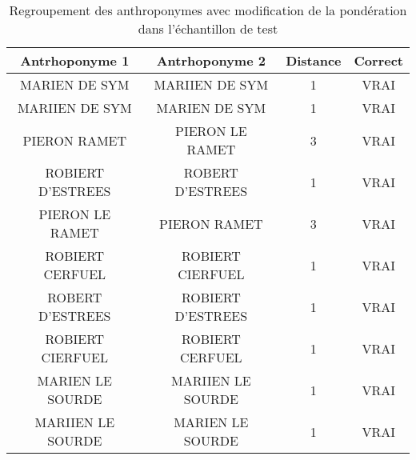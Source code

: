 \small
\begin{table}[ht]
    \centering
    \begin{tabular}{|c|c|c|c|}
    \hline	Antrhoponyme 1	&	Antrhoponyme 2	&	Distance	&	Correct	\\
    \hline
    \hline	MARIEN DE SYM	&	MARIIEN DE SYM	&	1	&	VRAI	\\
    \hline	MARIIEN DE SYM	&	MARIEN DE SYM	&	1	&	VRAI	\\
    \hline	PIERON RAMET	&	PIERON LE RAMET	&	3	&	VRAI	\\
    \hline	ROBIERT D'ESTREES	&	ROBERT D'ESTREES	&	1	&	VRAI	\\
    \hline	PIERON LE RAMET	&	PIERON RAMET	&	3	&	VRAI	\\
    \hline	ROBIERT CERFUEL	&	ROBIERT CIERFUEL	&	1	&	VRAI	\\
    \hline	ROBERT D'ESTREES	&	ROBIERT D'ESTREES	&	1	&	VRAI	\\
    \hline	ROBIERT CIERFUEL	&	ROBIERT CERFUEL	&	1	&	VRAI	\\
    \hline	MARIEN LE SOURDE	&	MARIIEN LE SOURDE	&	1	&	VRAI	\\
    \hline	MARIIEN LE SOURDE	&	MARIEN LE SOURDE	&	1	&	VRAI	\\
    \hline
    \end{tabular}
    \caption{Regroupement des anthroponymes avec modification de la pondération dans l'échantillon de test}
    \label{testc_anthro_md}
\end{table}
\normalsize